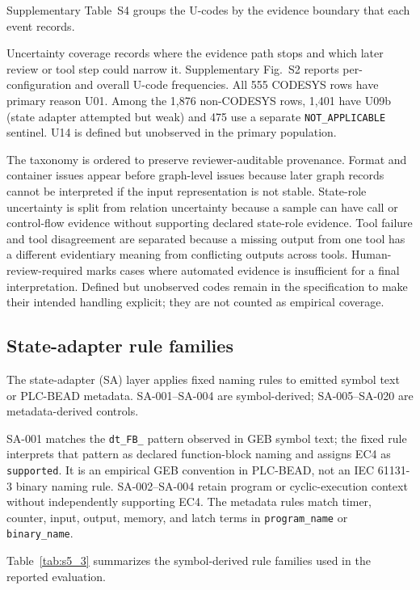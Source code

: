 \documentclass[a4paper,fleqn]{cas-dc}
\begin{document}
Supplementary Table~S4 groups the U-codes by the evidence boundary that each event records.

Uncertainty coverage records where the evidence path stops and which later review or tool step could narrow it. Supplementary Fig.~S2 reports per-configuration and overall U-code frequencies. All 555 CODESYS rows have primary reason U01. Among the 1{,}876 non-CODESYS rows, 1{,}401 have U09b (state adapter attempted but weak) and 475 use a separate \texttt{NOT\_APPLICABLE} sentinel. U14 is defined but unobserved in the primary population.

The taxonomy is ordered to preserve reviewer-auditable provenance. Format and container issues appear before graph-level issues because later graph records cannot be interpreted if the input representation is not stable. State-role uncertainty is split from relation uncertainty because a sample can have call or control-flow evidence without supporting declared state-role evidence. Tool failure and tool disagreement are separated because a missing output from one tool has a different evidentiary meaning from conflicting outputs across tools. Human-review-required marks cases where automated evidence is insufficient for a final interpretation. Defined but unobserved codes remain in the specification to make their intended handling explicit; they are not counted as empirical coverage.

\subsection{State-adapter rule families}
\label{sec:state_adapter}

The state-adapter (SA) layer applies fixed naming rules to emitted symbol text or PLC-BEAD metadata. SA-001--SA-004 are symbol-derived; SA-005--SA-020 are metadata-derived controls.

SA-001 matches the \texttt{dt\_FB\_} pattern observed in GEB symbol text; the fixed rule interprets that pattern as declared function-block naming and assigns EC4 as \texttt{supported}. It is an empirical GEB convention in PLC-BEAD, not an IEC 61131-3 binary naming rule. SA-002--SA-004 retain program or cyclic-execution context without independently supporting EC4. The metadata rules match timer, counter, input, output, memory, and latch terms in \texttt{program\_name} or \texttt{binary\_name}.

Table~\ref{tab:s5_3} summarizes the symbol-derived rule families used in the reported evaluation.
\end{document}
